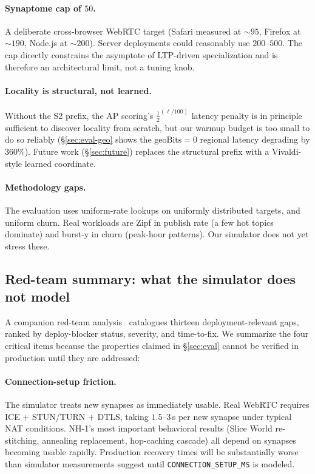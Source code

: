 \documentclass[conference]{IEEEtran}
\newcommand{\nhone}{NH-1\xspace}
\begin{document}
\paragraph{Synaptome cap of $50$.} A deliberate cross-browser WebRTC
target (Safari measured at $\sim\!95$, Firefox at $\sim\!190$, Node.js
at $\sim\!200$). Server deployments could reasonably use $200$--$500$.
The cap directly constrains the asymptote of LTP-driven specialization
and is therefore an architectural limit, not a tuning knob.

\paragraph{Locality is structural, not learned.} Without the S2 prefix,
the AP scoring's $\frac{1}{2}^{(\ell/100)}$ latency penalty is in
principle sufficient to discover locality from scratch, but our warmup
budget is too small to do so reliably (\S\ref{sec:eval-geo} shows the
$\mathrm{geoBits} = 0$ regional latency degrading by $360\%$). Future
work (\S\ref{sec:future}) replaces the structural prefix with a
Vivaldi-style learned coordinate.

\paragraph{Methodology gaps.} The evaluation uses uniform-rate lookups
on uniformly distributed targets, and uniform churn. Real workloads
are Zipf in publish rate (a few hot topics dominate) and burst-y in
churn (peak-hour patterns). Our simulator does not yet stress these.

\subsection{Red-team summary: what the simulator does not model}
\label{sec:redteam}

A companion red-team analysis~\cite{nh1redteam2026} catalogues thirteen
deployment-relevant gaps, ranked by deploy-blocker status, severity,
and time-to-fix. We summarize the four critical items because the
properties claimed in \S\ref{sec:eval} cannot be verified in production
until they are addressed:

\paragraph{Connection-setup friction.} The simulator treats new
synapses as immediately usable. Real WebRTC requires ICE + STUN/TURN
+ DTLS, taking $1.5$--$3$\,s per new synapse under typical NAT
conditions. \nhone's most important behavioral results
(Slice World re-stitching, annealing replacement, hop-caching
cascade) all depend on synapses becoming usable rapidly. Production
recovery times will be substantially worse than simulator measurements
suggest until \texttt{CONNECTION\_SETUP\_MS} is modeled.
\end{document}
